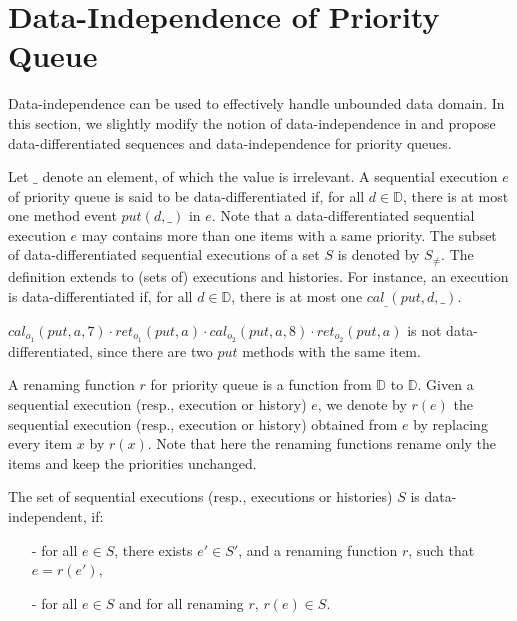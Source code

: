 \section{Data-Independence of Priority Queue}
\label{sec:data-independence of priority queue}

Data-independence \cite{Wolper:1986} can be used to effectively handle unbounded data domain. In this section, we slightly modify the notion of data-independence in \cite{Wolper:1986} and propose data-differentiated sequences and data-independence for priority queues.

Let $\_$ denote an element, of which the value is irrelevant. A sequential execution $e$ of priority queue is said to be data-differentiated if, for all $d \in \mathbb{D}$, there is at most one method event $\textit{put}(d,\_)$ in $e$. Note that a data-differentiated sequential execution $e$ may contains more than one items with a same priority. The subset of data-differentiated sequential executions of a set $S$ is denoted by $S_{\neq}$. The definition extends to (sets of) executions and histories. For instance, an execution is data-differentiated if, for all $d \in \mathbb{D}$, there is at most one $\textit{cal}_{\_}(\textit{put},d,\_)$.

\begin{example}\label{example:data-differentiated}
$\textit{cal}_{o_1}(\textit{put},a,7) \cdot \textit{ret}_{o_1}(\textit{put},a) \cdot \textit{cal}_{o_2}(\textit{put},a,8) \cdot \textit{ret}_{o_2}(\textit{put},a)$ is not data-differentiated, since there are two $\textit{put}$ methods with the same item.
\end{example}

A renaming function $r$ for priority queue is a function from $\mathbb{D}$ to $\mathbb{D}$. Given a sequential execution (resp., execution or history) $e$, we denote by $r(e)$ the sequential execution (resp., execution or history) obtained from $e$ by replacing every item $x$ by $r(x)$. Note that here the renaming functions rename only the items and keep the priorities unchanged.

\begin{definition}\label{def:priority-value data-independence}
The set of sequential executions (resp., executions or histories) $S$ is data-independent, if:
\begin{itemize}
\setlength{\itemsep}{0.5pt}
\item[-] for all $e \in S$, there exists $e' \in S'$, and a renaming function $r$, such that $e=r(e')$,

\item[-] for all $e \in S$ and for all renaming $r$, $r(e) \in S$.
\end{itemize}
\end{definition}

